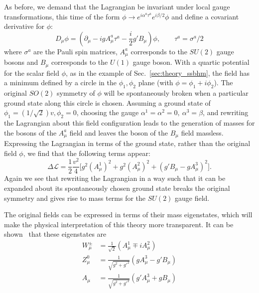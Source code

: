 As before, we demand that the Lagrangian be invariant under local gauge transformations, this time of the form $\phi \to e^{i \alpha^a \tau^a} e^{i \beta/2} \phi$ and define a covariant derivative for $\phi$:
\begin{equation}
    D_\mu \phi = (\partial_\mu - i g A^a_\mu \tau^a - \frac{i}{2} g' B_\mu) \phi, \qquad \tau^a = \sigma^a/2
\end{equation}
where $\sigma^a$ are the Pauli spin matrices, $A^a_\mu$ corresponds to the $SU(2)$ gauge bosons and $B_\mu$ corresponds to the $U(1)$ gauge boson.
With a quartic potential for the scalar field $\phi$, as in the example of Sec.~\ref{sec:theory_ssbhm}, the field has a minimum defined by a circle in the $\phi_1, \phi_2$ plane (with $\phi = \phi_1 + i \phi_2$).
The original $SO(2)$ symmetry of $\phi$ will be spontaneously broken when a particular ground state along this circle is chosen.
Assuming a ground state of $\phi_1 = (1/\sqrt{2})v, \phi_2 = 0$, choosing the gauge $\alpha^1 = \alpha^2 = 0,~\alpha^3 = \beta$, and rewriting the Lagrangian about this field configuration leads to the generation of masses for the bosons of the $A^a_\mu$ field and leaves the boson of the $B_\mu$ field massless.
Expressing the Lagrangian in terms of the ground state, rather than the original field $\phi$, we find that the following terms appear:
\begin{equation}
    \Delta \mathcal L = \frac{1}{2} \frac{v^2}{4} \bigg[ g^2 (A^1_\mu)^2 + g^2 (A^2_\mu)^2 + (g' B_\mu - g A^3_\mu)^2 \bigg].
\end{equation}
Again we see that rewriting the Lagrangian in a way such that it can be expanded about its spontaneously chosen ground state breaks the original symmetry and gives rise to mass terms for the $SU(2)$ gauge field. 

The original fields can be expressed in terms of their mass eigenstates, which will make the physical interpretation of this theory more transparent.
It can be shown~\cite{Peskin:1995ev} that these eigenstates are
\begin{align}
    W^\pm_\mu &= \frac{1}{\sqrt{2}} (A^1_\mu \mp i A^2_\mu) \\
    Z^0_\mu &= \frac{1}{\sqrt{g^2 + g'^2}}(g A^3_\mu - g' B_\mu) \\
    A_\mu &= \frac{1}{\sqrt{g^2 + g'^2}}(g'A_\mu^3 + g B_\mu)
\end{align}

